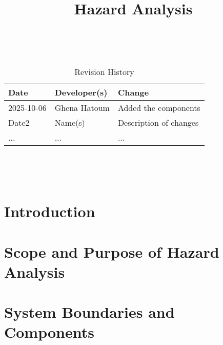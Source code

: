 \documentclass{article}
\title{Hazard Analysis\\\progname}
\author{\authname}
\date{}
\begin{document}
\maketitle
\thispagestyle{empty}

~\newpage


\begin{table}[hp]
\caption{Revision History} \label{TblRevisionHistory}
\begin{tabularx}{\textwidth}{llX}
\toprule
\textbf{Date} & \textbf{Developer(s)} & \textbf{Change}\\
\midrule
2025-10-06 & Ghena Hatoum & Added the components\\
Date2 & Name(s) & Description of changes\\
... & ... & ...\\
\bottomrule
\end{tabularx}
\end{table}

~\newpage

\tableofcontents

~\newpage



\section{Introduction}


\section{Scope and Purpose of Hazard Analysis}


\section{System Boundaries and Components}
\end{document}
